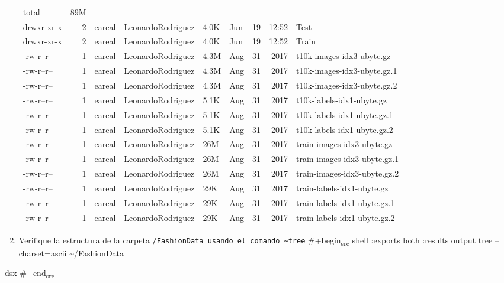 \documentclass{article}
\begin{document}
\begin{enumerate}
\begin{verbatim}
\end{verbatim}

\begin{center}
\begin{tabular}{lrllllrrl}
total & 89M &  &  &  &  &  &  & \\[0pt]
drwxr-xr-x & 2 & eareal & LeonardoRodriguez & 4.0K & Jun & 19 & 12:52 & Test\\[0pt]
drwxr-xr-x & 2 & eareal & LeonardoRodriguez & 4.0K & Jun & 19 & 12:52 & Train\\[0pt]
-rw-r--r-- & 1 & eareal & LeonardoRodriguez & 4.3M & Aug & 31 & 2017 & t10k-images-idx3-ubyte.gz\\[0pt]
-rw-r--r-- & 1 & eareal & LeonardoRodriguez & 4.3M & Aug & 31 & 2017 & t10k-images-idx3-ubyte.gz.1\\[0pt]
-rw-r--r-- & 1 & eareal & LeonardoRodriguez & 4.3M & Aug & 31 & 2017 & t10k-images-idx3-ubyte.gz.2\\[0pt]
-rw-r--r-- & 1 & eareal & LeonardoRodriguez & 5.1K & Aug & 31 & 2017 & t10k-labels-idx1-ubyte.gz\\[0pt]
-rw-r--r-- & 1 & eareal & LeonardoRodriguez & 5.1K & Aug & 31 & 2017 & t10k-labels-idx1-ubyte.gz.1\\[0pt]
-rw-r--r-- & 1 & eareal & LeonardoRodriguez & 5.1K & Aug & 31 & 2017 & t10k-labels-idx1-ubyte.gz.2\\[0pt]
-rw-r--r-- & 1 & eareal & LeonardoRodriguez & 26M & Aug & 31 & 2017 & train-images-idx3-ubyte.gz\\[0pt]
-rw-r--r-- & 1 & eareal & LeonardoRodriguez & 26M & Aug & 31 & 2017 & train-images-idx3-ubyte.gz.1\\[0pt]
-rw-r--r-- & 1 & eareal & LeonardoRodriguez & 26M & Aug & 31 & 2017 & train-images-idx3-ubyte.gz.2\\[0pt]
-rw-r--r-- & 1 & eareal & LeonardoRodriguez & 29K & Aug & 31 & 2017 & train-labels-idx1-ubyte.gz\\[0pt]
-rw-r--r-- & 1 & eareal & LeonardoRodriguez & 29K & Aug & 31 & 2017 & train-labels-idx1-ubyte.gz.1\\[0pt]
-rw-r--r-- & 1 & eareal & LeonardoRodriguez & 29K & Aug & 31 & 2017 & train-labels-idx1-ubyte.gz.2\\[0pt]
\end{tabular}
\end{center}

\item Verifique la estructura de la carpeta \texttt{/FashionData usando el
   comando \textasciitilde{}tree}
\#+begin\textsubscript{src} shell :exports both :results output
tree --charset=ascii \textasciitilde{}/FashionData
\end{enumerate}
dsx   \#+end\textsubscript{src}
\end{document}
